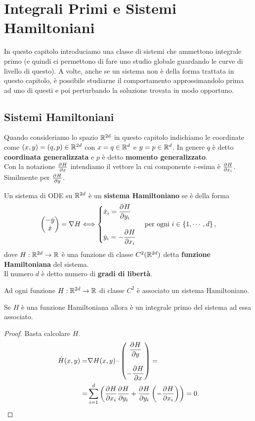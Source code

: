 \chapter{Integrali Primi e Sistemi Hamiltoniani}
In questo capitolo introduciamo una classe di sistemi che ammettono integrale primo (e quindi ci permettono di fare uno studio globale guardando le curve di livello di questo). A volte, anche se un sistema non \`e della forma trattata in questo capitolo, \`e possibile studiarne il comportamento approssimandolo prima ad uno di questi e poi perturbando la soluzione trovata in modo opportuno.
\section{Sistemi Hamiltoniani}
\begin{notation}
Quando consideriamo lo spazio $\mathbb{R}^{2d}$ in questo capitolo indichiamo le coordinate come $(x,y)=(q,p)\in\mathbb{R}^{2d}$ con $x=q\in\mathbb{R}^d$ e $y=p\in\mathbb{R}^d$. In genere $q$ \`e detto \textbf{coordinata generalizzata} e $p$ \`e detto \textbf{momento generalizzato}.\\
Con la notazione $\pp xH$ intendiamo il vettore la cui componente $i$-esima \`e $\ppxi iH$. Similmente per $\pp yH$.
\end{notation}
\begin{definition}
Un sistema di ODE su $\mathbb{R}^{2d}$ \`e un \textbf{sistema Hamiltoniano} se \`e della forma
\[\mat{-\dot y\\\dot x}=\nabla H\coimplies \begin{cases}
\displaystyle \dot x_i=\pp{y_i}H\\\\
\displaystyle \dot y_i=-\pp{x_i}H
\end{cases}\text{per ogni }i\in\cpa{1,\cdots,d},\]
dove $H:\mathbb{R}^{2d}\to\mathbb{R}$ \`e una funzione di classe $C^2(\mathbb{R}^{2d})$ detta \textbf{funzione Hamiltoniana} del sistema.\\
Il numero $d$ \`e detto numero di \textbf{gradi di libert\`a}.
\end{definition}
\begin{remark}
Ad ogni funzione $H:\mathbb{R}^{2d}\to\mathbb{R}$ di classe $C^2$ \`e associato un sistema Hamiltoniano.
\end{remark}

\begin{proposition}\label{HamiltonianaEIntegralePrimo}
Se $H$ \`e una funzione Hamiltoniana allora \`e un integrale primo del sistema ad essa associato.
\end{proposition}
\begin{proof}
Basta calcolare $\dot H$.
\begin{align*}
\dot H(x,y)=&\nabla H(x,y)\cdot \mat{\displaystyle \pp {y}H \\\\ \displaystyle -\pp {x}H}=\\
=&\sum_{i=1}^d\pa{\pp{x_i}H\pp{y_i}H+\pp{y_i}H\pa{-\pp{x_i}H}}=0.
\end{align*}
\end{proof}

